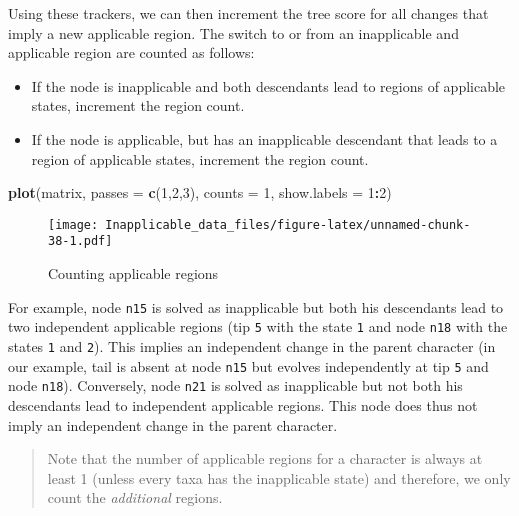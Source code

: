 \documentclass[]{book}
\newenvironment{Shaded}{\begin{snugshade}}{\end{snugshade}}
\newcommand{\KeywordTok}[1]{\textcolor[rgb]{0.13,0.29,0.53}{\textbf{#1}}}
\newcommand{\DataTypeTok}[1]{\textcolor[rgb]{0.13,0.29,0.53}{#1}}
\newcommand{\DecValTok}[1]{\textcolor[rgb]{0.00,0.00,0.81}{#1}}
\newcommand{\OperatorTok}[1]{\textcolor[rgb]{0.81,0.36,0.00}{\textbf{#1}}}
\newcommand{\NormalTok}[1]{#1}
\providecommand{\tightlist}{%
  \setlength{\itemsep}{0pt}\setlength{\parskip}{0pt}}
\theoremstyle{definition}
\theoremstyle{definition}
\theoremstyle{definition}
\theoremstyle{remark}
\begin{document}
Using these trackers, we can then increment the tree score for all
changes that imply a new applicable region. The switch to or from an
inapplicable and applicable region are counted as follows:

\begin{itemize}
\tightlist
\item
  If the node is inapplicable and both descendants lead to regions of
  applicable states, increment the region count.
\item
  If the node is applicable, but has an inapplicable descendant that
  leads to a region of applicable states, increment the region count.
\end{itemize}

\begin{Shaded}
\begin{Highlighting}[]
\KeywordTok{plot}\NormalTok{(matrix, }\DataTypeTok{passes =} \KeywordTok{c}\NormalTok{(}\DecValTok{1}\NormalTok{,}\DecValTok{2}\NormalTok{,}\DecValTok{3}\NormalTok{), }\DataTypeTok{counts =} \DecValTok{1}\NormalTok{, }\DataTypeTok{show.labels =} \DecValTok{1}\OperatorTok{:}\DecValTok{2}\NormalTok{)}
\end{Highlighting}
\end{Shaded}

\begin{figure}
\centering
\texttt{[image: Inapplicable\_data\_files/figure-latex/unnamed-chunk-38-1.pdf]}
\caption{\label{fig:unnamed-chunk-38}Counting applicable regions}
\end{figure}

For example, node \texttt{n15} is solved as inapplicable but both his
descendants lead to two independent applicable regions (tip \texttt{5}
with the state \texttt{1} and node \texttt{n18} with the states
\texttt{1} and \texttt{2}). This implies an independent change in the
parent character (in our example, tail is absent at node \texttt{n15}
but evolves independently at tip \texttt{5} and node \texttt{n18}).
Conversely, node \texttt{n21} is solved as inapplicable but not both his
descendants lead to independent applicable regions. This node does thus
not imply an independent change in the parent character.

\begin{quote}
Note that the number of applicable regions for a character is always at
least 1 (unless every taxa has the inapplicable state) and therefore, we
only count the \emph{additional} regions.
\end{quote}
\end{document}
